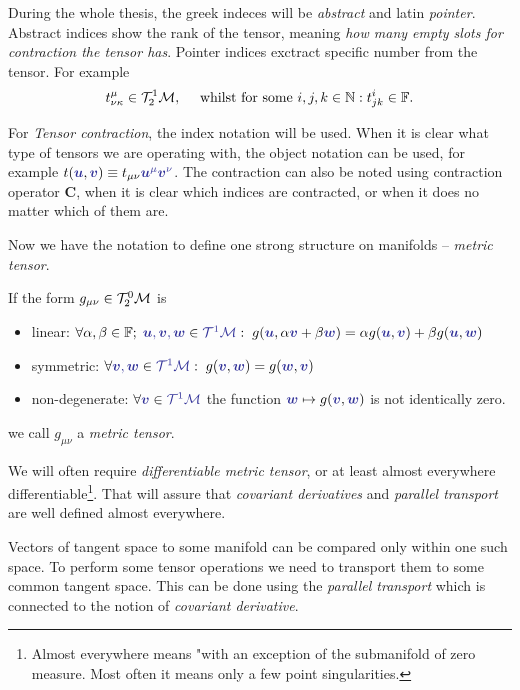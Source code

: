 During the whole thesis, the greek indeces will be \emph{abstract} and latin \emph{pointer}. Abstract indices show the rank of the tensor, meaning \emph{how many empty slots for contraction the tensor has}. Pointer indices exctract specific number from the tensor. For example
$$t^\mu_{\nu\kappa} \in \mathcal{T}^1_2\mathcal{M}, \quad \text{ whilst for some }i,j,k\in\mathbb{N}: t^i_{jk}\in \mathbb F.$$

For \emph{Tensor contraction}, the index notation will be used. When it is clear what type of tensors we are operating with, the object notation can be used, for example $t(\bluee{\bm u},\bluee{\bm v})\equiv t_{\mu\nu}\bluee{\bm u^\mu \bm v^\nu}$. The contraction can also be noted using contraction operator $\mathbf C$, when it is clear which indices are contracted, or when it does no matter which of them are.

Now we have the notation to define one strong structure on manifolds -- \emph{metric tensor}. 
\begin{definition}
If the form $g_{\mu\nu}\in\mathcal{T}^0_2\mathcal{M}$ is
\begin{itemize}
    \item linear: $\forall \alpha,\beta\in\mathbb F;\; \bluee{\bm u,\bm v,\bm w}\in \bluee{\TT^1\M}: \; g(\bluee{\bm u},\alpha\bluee{\bm v}+\beta \bluee{\bm w}) = \alpha g(\bluee{\bm u},\bluee{\bm v})+\beta g(\bluee{\bm u},\bluee{\bm w})$
    \item symmetric: $\forall \bluee{\bm v,\bm w}\in \bluee{\TT^1\M}: \; g(\bluee{\bm v},\bluee{\bm w})=g(\bluee{\bm w},\bluee{\bm v})$ 
    \item non-degenerate: $\forall \bluee{\bm v}\in\bluee{\TT^1\M}$ the function $\bluee{\bm w}\mapsto g(\bluee{\bm v},\bluee{\bm w})$ is not identically zero.
\end{itemize} 
we call $g_{\mu\nu}$ a \emph{metric tensor}.
\end{definition}

We will often require \emph{differentiable metric tensor}, or at least almost everywhere differentiable\footnote{Almost everywhere means "with an exception of the submanifold of zero measure. Most often it means only a few point singularities.}. That will assure that \emph{covariant derivatives} and \emph{parallel transport} are well defined almost everywhere. 




Vectors of tangent space to some manifold can be compared only within one such space. To perform some tensor operations we need to transport them to some common tangent space. This can be done using the \emph{parallel transport} which is connected to the notion of \emph{covariant derivative}.


